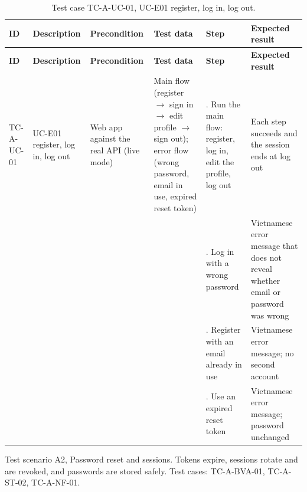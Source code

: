 {\footnotesize{}\renewcommand{\arraystretch}{1.1}
\begin{longtable}{|>{\raggedright\arraybackslash}p{}|>{\raggedright\arraybackslash}p{}|>{\raggedright\arraybackslash}p{}|>{\raggedright\arraybackslash}p{}|>{\raggedright\arraybackslash}p{}|>{\raggedright\arraybackslash}p{}|}
\caption{Test case TC-A-UC-01, UC-E01 register, log in, log out.} \\
\hline
\textbf{ID} & \textbf{Description} & \textbf{Precondition} & \textbf{Test data} & \textbf{Step} & \textbf{Expected result} \\ \hline
\endfirsthead
\hline
\textbf{ID} & \textbf{Description} & \textbf{Precondition} & \textbf{Test data} & \textbf{Step} & \textbf{Expected result} \\ \hline
\endhead
TC-A-UC-01 & UC-E01 register, log in, log out & Web app against the real API (live mode) & Main flow (register $\rightarrow$ sign in $\rightarrow$ edit profile $\rightarrow$ sign out); error flow (wrong password, email in use, expired reset token) & 1. Run the main flow: register, log in, edit the profile, log out & Each step succeeds and the session ends at log out \\ \cline{5-6}
 &  &  &  & 2. Log in with a wrong password & Vietnamese error message that does not reveal whether email or password was wrong \\ \cline{5-6}
 &  &  &  & 3. Register with an email already in use & Vietnamese error message; no second account \\ \cline{5-6}
 &  &  &  & 4. Use an expired reset token & Vietnamese error message; password unchanged \\ \hline
\end{longtable}
}

Test scenario A2, Password reset and sessions. Tokens expire, sessions rotate and are revoked, and passwords are stored safely. Test cases: TC-\allowbreak{}A-\allowbreak{}BVA-\allowbreak{}01, TC-A-ST-02, TC-A-NF-01.

